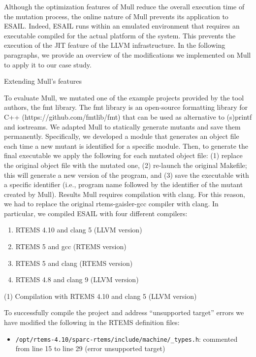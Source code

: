 Although the optimization features of Mull reduce the overall execution time of the mutation process, the online nature of Mull prevents its application to ESAIL. Indeed, ESAIL runs within an emulated environment that requires an executable compiled for the actual platform of the system. This prevents the execution of the JIT feature of the LLVM infrastructure. In the following paragraphs, we provide an overview of the modifications we implemented on Mull to apply it to our case study.

Extending Mull’s features

To evaluate Mull, we mutated one of the example projects provided by the tool authors, the fmt library. The fmt library is an open-source formatting library for C++ (https://github.com/fmtlib/fmt) that can be used as alternative to (s)printf and iostreams.
We adapted Mull to statically generate mutants and save them permanently. Specifically, we developed a module that generates an object file each time a new mutant is identified for a specific module. Then, to generate the final executable we apply the following for each mutated object file: (1) replace the original object file with the mutated one, (2) re-launch the original Makefile; this will generate a new version of the program, and (3) save the executable with a specific identifier (i.e., program name followed by the identifier of the mutant created by Mull).
Results
Mull requires compilation with clang. For this reason, we had to replace the original rtems-gaisler-gcc compiler with clang. In particular, we compiled ESAIL with four different compilers:

\begin{enumerate}
	\item RTEMS 4.10 and clang 5 (LLVM version)
	\item RTEMS 5 and gcc (RTEMS version)
	\item RTEMS 5 and clang (RTEMS version)
	\item RTEMS 4.8 and clang 9 (LLVM version)
\end{enumerate}

(1) Compilation with RTEMS 4.10 and clang 5 (LLVM version)

To successfully compile the project and address “unsupported target” errors we have modified the following in the RTEMS definition files:

\begin{itemize}
	\item \texttt{/opt/rtems-4.10/sparc-rtems/include/machine/\_types.h}: commented from line 15 to line 29 (error unsupported target)
\end{itemize}

